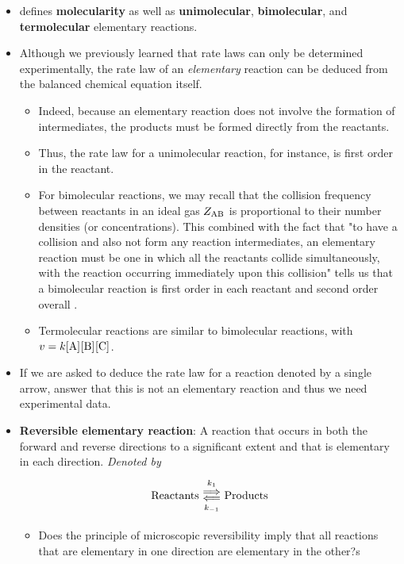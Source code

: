 \documentclass[../notes.tex]{subfiles}
\begin{document}
\begin{itemize}
    \item \textcite{bib:McQuarrieSimon} defines \textbf{molecularity} as well as \textbf{unimolecular}, \textbf{bimolecular}, and \textbf{termolecular} elementary reactions.
    \item Although we previously learned that rate laws can only be determined experimentally, the rate law of an \emph{elementary} reaction can be deduced from the balanced chemical equation itself.
    \begin{itemize}
        \item Indeed, because an elementary reaction does not involve the formation of intermediates, the products must be formed directly from the reactants.
        \item Thus, the rate law for a unimolecular reaction, for instance, is first order in the reactant.
        \item For bimolecular reactions, we may recall that the collision frequency between reactants in an ideal gas $Z_{\ce{A}\ce{B}}$ is proportional to their number densities (or concentrations). This combined with the fact that "to have a collision and also not form any reaction intermediates, an elementary reaction must be one in which all the reactants collide simultaneously, with the reaction occurring immediately upon this collision" tells us that a bimolecular reaction is first order in each reactant and second order overall \parencite[1182]{bib:McQuarrieSimon}.
        \item Termolecular reactions are similar to bimolecular reactions, with $v=k\cnc{A}\cnc{B}\cnc{C}$.
    \end{itemize}
    \item If we are asked to deduce the rate law for a reaction denoted by a single arrow, answer that this is not an elementary reaction and thus we need experimental data.
    \item \textbf{Reversible elementary reaction}: A reaction that occurs in both the forward and reverse directions to a significant extent and that is elementary in each direction. \emph{Denoted by}
    \begin{equation*}
        \text{Reactants} \Longleftrightarrows[k_1][k_{-1}] \text{Products}
    \end{equation*}
    \begin{itemize}
        \item Does the principle of microscopic reversibility imply that all reactions that are elementary in one direction are elementary in the other?s
    \end{itemize}

\end{itemize}
\end{document}
